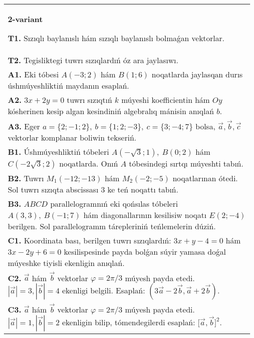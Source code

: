 \documentclass{article}
\begin{document}
\begin{tabular}{m{17cm}}
\textbf{2-variant}

\textbf{T1.} 
Sızıqlı baylanıslı hám sızıqlı baylanıslı bolmaǵan vektorlar.
 \\
\textbf{T2.} 
Tegisliktegi tuwrı sızıqlardıń óz ara jaylasıwı.
 \\
\textbf{A1.} 
Eki tóbesi $A (-3; 2) $ hám $B (1; 6) $ noqatlarda
jaylasqan durıs úshmúyeshliktiń maydanın esaplań.
 \\
\textbf{A2.} 
$3x+2y=0$ tuwrı sızıqtıń $k$ múyeshi
koefficientin hám $Oy$ kósherinen kesip algan kesindiniń algebralıq
mánisin anıqlań $b$.
 \\
\textbf{A3.} 
Eger \(a = \{ 2; - 1;2\}, \ b = \{ 1;2; - 3\}, \ c = \{ 3; - 4;7\}\) bolsa, $\overrightarrow{a}, \overrightarrow{b}, \overrightarrow{c}$ vektorlar komplanar boliwin tekseriń.
 \\
\textbf{B1.} 
Úshmúyeshliktiń tóbeleri
\(A\left(-\sqrt{3};1 \right),\ B (0;2) \) hám
\(C\left(-2\sqrt{3};2 \right) \) noqatlarda. Onıń $A$
tóbesindegi sırtqı múyeshti tabıń.
 \\
\textbf{B2.} 
Tuwrı \(M_{1} (-12;-13) \) hám \(M_{2} (-2;-5) \)
noqatlarınan ótedi. Sol tuwrı sızıqta abscissası 3 ke teń noqattı tabıń.
 \\
\textbf{B3.} 
$ABCD$ parallelogramnıń eki qońsılas tóbeleri
\(A (3,3),\ B (-1;7) \) hám diagonallarının kesilisiw noqatı
\(E (2;-4) \) berilgen. Sol parallelogramm tárepleriniń teńlemelerin
dúziń.
 \\
\textbf{C1.} 
Koordinata bası, berilgen tuwrı sızıqlardıń:
\(3x+y-4=0\) hám \(3x-2y+6=0\) kesilispesinde payda 
bolǵan súyir yamasa doǵal múyeshke tiyisli ekenligin anıqlań.
 \\
\textbf{C2.} 
$\vec{a}$ hám $\vec{b}$ vektorlar $\varphi = 2\pi/3$ múyesh payda etedi. $|\vec{a}| = 3,|\vec{b}| = 4$ ekenligi belgili. Esaplań:
$\left(3\vec{a} - 2\vec{b},\vec{a} + 2\vec{b} \right) $.
 \\
\textbf{C3.} 
$\vec{a}$ hám $\vec{b}$ vektorlar $\varphi = 2\pi/3$ múyesh payda etedi. $|\vec{a}| = 1,|\vec{b}| = 2$ ekenligin bilip, tómendegilerdi esaplań:
$\lbrack\vec{a},\vec{b}\rbrack^{2}$.
 \\

\end{tabular}
\vspace{1cm}
\end{document}
